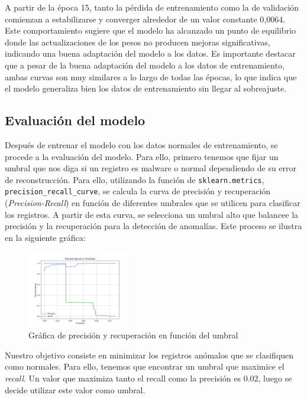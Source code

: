A partir de la época 15, tanto la pérdida de entrenamiento como la de validación comienzan a estabilizarse y converger alrededor de un valor constante 0,0064. Este comportamiento sugiere que el modelo ha alcanzado un punto de equilibrio donde las actualizaciones de los pesos no producen mejoras significativas, indicando una buena adaptación del modelo a los datos. Es importante destacar que a pesar de la buena adaptación del modelo a los datos de entrenamiento, ambas curvas son muy similares a lo largo de todas las épocas, lo que indica que el modelo generaliza bien los datos de entrenamiento sin llegar al sobreajuste.


\subsection{Evaluación del modelo}


Después de entrenar el modelo con los datos normales de entrenamiento, se procede a la evaluación del modelo. Para ello, primero tenemos que fijar un umbral que nos diga si un registro es malware o normal dependiendo de su error de reconstrucción. Para ello, utilizando la función de \lstinline|sklearn.metrics|, \lstinline|precision_recall_curve|, se calcula la curva de precisión y recuperación (\textit{Precision-Recall}) en función de diferentes umbrales que se utilicen para clasificar los registros. A partir de esta curva, se selecciona un umbral alto que balancee la precisión y la recuperación para la detección de anomalías. Este proceso se ilustra en la siguiente gráfica:

\begin{figure}[H]
    \centering
    \includegraphics[width=0.4\textwidth]{img/umbral.png} 
    \caption{Gráfica de precisión y recuperación en función del umbral}
    \label{fig:precision_recall}
\end{figure}

Nuestro objetivo consiste en minimizar los registros anómalos que se clasifiquen como normales. Para ello, tenemos que encontrar un umbral que maximice el \textit{recall}. Un valor que maximiza tanto el recall como la precisión es 0.02, luego se decide utilizar este valor como umbral. 

